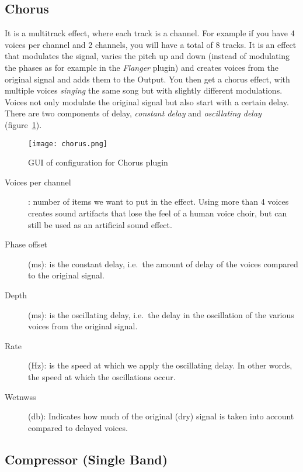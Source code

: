 \subsection{Chorus}%
\label{sub:chorus}

It is a multitrack effect, where each track is a channel. For example if you have 4 voices per channel and 2 channels, you will have a total of 8 tracks.
It is an effect that modulates the signal, varies the pitch up and down (instead of modulating the phases as for example in the \textit{Flanger} plugin) and creates voices from the original signal and adds them to the Output. You then get a chorus effect, with multiple voices \textit{singing} the same song but with slightly different modulations. Voices not only modulate the original signal but also start with a certain delay. There are two components of delay, \textit{constant delay} and \textit{oscillating delay} (figure~\ref{fig:chorus}).

\begin{figure}[htpb]
	\centering
	\texttt{[image: chorus.png]}
	\caption{GUI of configuration for Chorus plugin}
	\label{fig:chorus}
\end{figure}

\begin{description}
	\item[Voices per channel]: number of items we want to put in the effect. Using more than 4 voices creates sound artifacts that lose the feel of a human voice choir, but can still be used as an artificial sound effect.
	\item[Phase offset] (ms): is the constant delay, i.e.\ the amount of delay of the voices compared to the original signal.
	\item[Depth] (ms): is the oscillating delay, i.e.\ the delay in the oscillation of the various voices from the original signal.
	\item[Rate] (Hz): is the speed at which we apply the oscillating delay. In other words, the speed at which the oscillations occur.
	\item[Wetnwss] (db): Indicates how much of the original (dry) signal is taken into account compared to delayed voices.
\end{description}

\subsection{Compressor (Single Band)}%
\label{sub:compressor}

